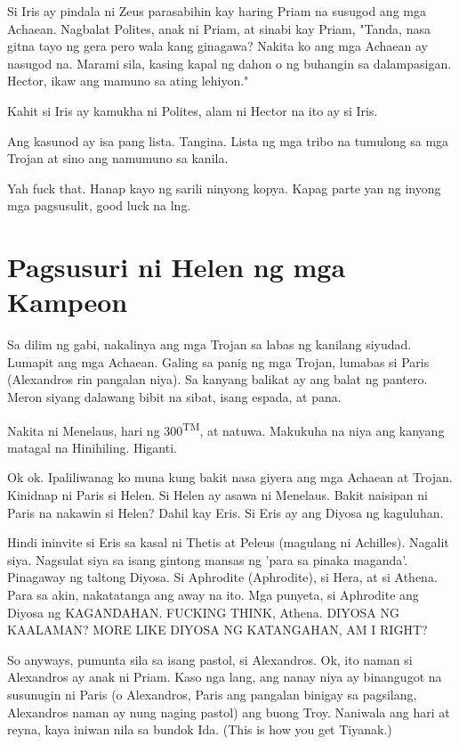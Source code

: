 \documentclass[12pt,letterpaper]{report}
\begin{document}
Si Iris ay pindala ni Zeus parasabihin kay haring Priam na susugod ang mga Achaean. Nagbalat Polites, anak ni Priam, at sinabi kay Priam, "Tanda, nasa gitna tayo ng gera pero wala kang ginagawa?
Nakita ko ang mga Achaean ay nasugod na. Marami sila, kasing kapal ng dahon o ng buhangin sa dalampasigan. Hector, ikaw ang mamuno sa ating lehiyon."

Kahit si Iris ay kamukha ni Polites, alam ni Hector na ito ay si Iris.

Ang kasunod ay isa pang lista. Tangina. Lista ng mga tribo na tumulong sa mga Trojan at sino ang namumuno sa kanila.

Yah fuck that. Hanap kayo ng sarili ninyong kopya. Kapag parte yan ng inyong mga pagsusulit, good luck na lng.

\pagebreak
\chapter{Pagsusuri ni Helen ng mga Kampeon}

Sa dilim ng gabi, nakalinya ang mga Trojan sa labas ng kanilang siyudad. Lumapit ang mga Achaean. Galing sa panig ng mga Trojan, lumabas si Paris (Alexandros rin pangalan niya). Sa kanyang balikat ay ang balat ng pantero. Meron siyang dalawang bibit na sibat, isang espada, at pana.

Nakita ni Menelaus, hari ng 300\textsuperscript{TM}, at natuwa. Makukuha na niya ang kanyang matagal na Hinihiling. Higanti.

Ok ok. Ipaliliwanag ko muna kung bakit nasa giyera ang mga Achaean at Trojan. Kinidnap ni Paris si Helen. Si Helen ay asawa ni Menelaus. Bakit naisipan ni Paris na nakawin si Helen?
Dahil kay Eris. Si Eris ay ang Diyosa ng kaguluhan.

Hindi ininvite si Eris sa kasal ni Thetis at Peleus (magulang ni Achilles). Nagalit siya. Nagsulat siya sa isang gintong mansas ng 'para sa pinaka maganda'. Pinagaway ng taltong Diyosa. Si Aphrodite (Aphrodite), si Hera, at si Athena. Para sa akin, nakatatanga ang away na ito. Mga punyeta, si Aphrodite ang Diyosa ng KAGANDAHAN. FUCKING THINK, Athena. DIYOSA NG KAALAMAN?
MORE LIKE DIYOSA NG KATANGAHAN, AM I RIGHT?

So anyways, pumunta sila sa isang pastol, si Alexandros. Ok, ito naman si Alexandros ay anak ni Priam. Kaso nga lang, ang nanay niya ay binangugot na susunugin ni Paris (o Alexandros, Paris ang pangalan binigay sa pagsilang, Alexandros naman ay nung naging pastol)
ang buong Troy. Naniwala ang hari at reyna, kaya iniwan nila sa bundok Ida. (This is how you get Tiyanak.)
\end{document}
